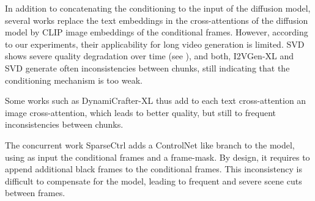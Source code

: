 In addition to concatenating the conditioning to the input of the diffusion model, several works  \cite{SVD,2023i2vgenxl,wang2024videocomposer} replace the text embeddings in the cross-attentions of the diffusion model by CLIP  \cite{CLIP_paper} image embeddings of the conditional frames.  However, according to our experiments,  their applicability for long video generation is limited. SVD \cite{SVD} shows severe quality degradation over time (see ), and both, I2VGen-XL \cite{2023i2vgenxl} and  SVD \cite{SVD}  generate often inconsistencies between chunks, still indicating that the conditioning mechanism is too weak. 

Some works \cite{xing2023dynamicrafter,chen2023livephoto} such as DynamiCrafter-XL \cite{xing2023dynamicrafter} thus add to each text cross-attention an image cross-attention, which leads to better quality, but still to frequent inconsistencies between chunks.

The concurrent work SparseCtrl \cite{guo2023sparsectrl} adds a ControlNet \cite{controlnet} like branch to the model, using as input the conditional frames and a frame-mask. By design, it requires to append additional black frames to the conditional frames.  This inconsistency is difficult to compensate for the model, leading to frequent and severe scene cuts between frames.  


